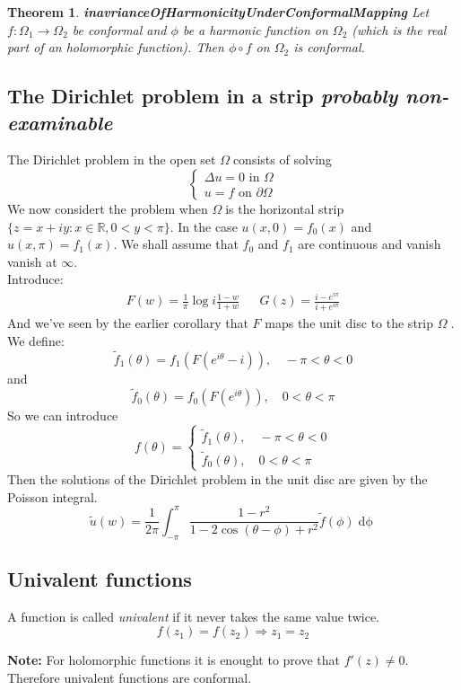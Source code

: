 \documentclass{article}
\newtheorem{theorem}{Theorem}[section]
\newenvironment{definition}[1][Definition]{\begin{trivlist}
\item[\hskip \labelsep {\bfseries #1}]}{\end{trivlist}}
\newcommand{\R}{\mathbb{R}}
\newcommand{\OO}{$ \Omega \;$}
\begin{document}
\begin{theorem} \label{inavrianceOfHarmonicityUnderConformalMapping} \textbf{inavrianceOfHarmonicityUnderConformalMapping}
    Let $f : \Omega_1 \rightarrow \Omega_2$ be conformal and $\phi$ be a harmonic function on $\Omega_2$ (which is 
    the real part of an holomorphic function). Then $\phi \circ f$ on $\Omega_2$ is conformal.
\end{theorem}

\subsection*{The Dirichlet problem in a strip \textit{\small{probably non-examinable}}}
The Dirichlet problem in the open set \OO consists of solving
\[
    \begin{cases}
        \Delta u = 0 \text{ in } \Omega\\
        u = f \text{ on } \partial\Omega
    \end{cases}
\]
We now considert the problem when \OO is the horizontal strip $\{ z = x+iy: x\in\R, 0 < y < \pi \}$.
In the case $u(x, 0) = f_0(x)$ and $u(x, \pi) = f_1(x)$. We shall assume that $f_0$ and $f_1$ are continuous
and vanish vanish at $\infty$.\\
Introduce:
\begin{align*}
    F(w) = \frac{1}{\pi} \log i\frac{1-w}{1+w} && G(z) = \frac{i-e^{i\pi}}{i+e^{i\pi}}
\end{align*}
And we've seen by the earlier corollary that $F$ maps the unit disc to the strip \OO. We define:
\[ \tilde{f}_1(\theta) = f_1(F(e^{i\theta} - i)), \quad -\pi < \theta < 0 \]
and
\[ \tilde{f}_0(\theta) = f_0(F(e^{i\theta})), \quad 0 < \theta < \pi \]
So we can introduce
\[
    f(\theta) = 
\begin{cases}
    \tilde{f}_1(\theta), \quad -\pi < \theta < 0\\
    \tilde{f}_0(\theta), \quad 0 < \theta < \pi
\end{cases}
\]
Then the solutions of the Dirichlet problem in the unit disc are given by the Poisson integral.
\[ \tilde{u}(w) = \frac{1}{2\pi} \int_{-\pi}^\pi \frac{1 - r^2}{1 - 2\cos(\theta - \phi) + r^2} \tilde{f}(\phi) \mathop{d\phi} \]

\subsection*{Univalent functions}
\begin{definition}
    A function is called \textit{univalent} if it never takes the same value twice.
    \[ f(z_1) = f(z_2) \Rightarrow z_1 = z_2 \]
\end{definition}
\textbf{Note:} For holomorphic functions it is enought to prove that $f'(z) \neq 0$. Therefore univalent
functions are conformal.
\end{document}
